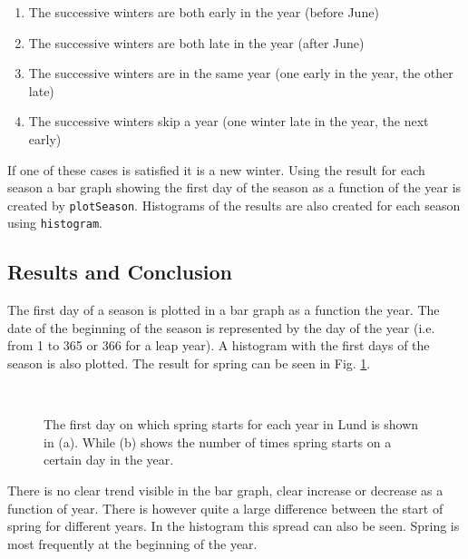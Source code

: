 \begin{enumerate}
\item The successive winters are both early in the year (before June)
\item The successive winters are both late in the year (after June)
\item The successive winters are in the same year (one early in the year, the other late)
\item The successive winters skip a year (one winter late in the year, the next early)
\end{enumerate}

If one of these cases is satisfied it is a new winter. Using the result for each season a bar graph showing the first day of the season as a function of the year is created by \texttt{plotSeason}. Histograms of the results are also created for each season using \texttt{histogram}. 

\subsection{Results and Conclusion}

The first day of a season is plotted in a bar graph as a function the year. The date of the beginning of the season is represented by the day of the year (i.e. from 1 to 365 or 366 for a leap year). A histogram with the first days of the season is also plotted. The result for spring can be seen in Fig. \ref{fig:spring}. \\

\begin{figure}[ht!]
\centering
{} 
\\
\caption{The first day on which spring starts for each year in Lund is shown in (a).  While (b) shows the number of times spring starts on a certain day in the year.}
\label{fig:spring}
\end{figure}

There is no clear trend visible in the bar graph, clear increase or decrease as a function of year. There is however quite a large difference between the start of spring for different years. In the histogram this spread can also be seen. Spring is most frequently at the beginning of the year. \\


